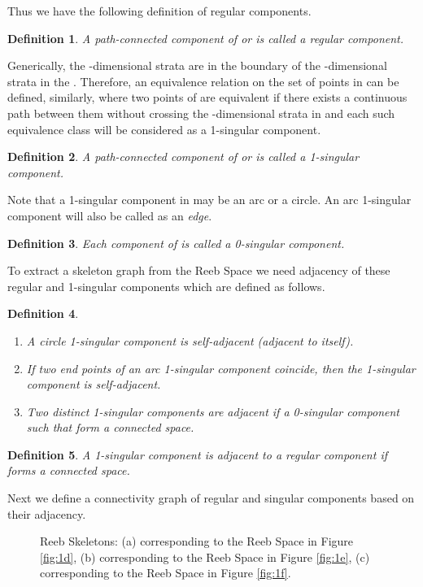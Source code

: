 \documentclass[twocolumn]{article}
\newcommand{\figref}[1]{Figure \ref{fig:#1}}
\newtheorem{dfn}{Definition}[section]
\begin{document}
\noindent
Thus we have the following definition of regular components.

\begin{dfn}
A path-connected component of  or  is called a regular component. 
\end{dfn}

\noindent
Generically, the -dimensional strata are in the boundary of
the -dimensional strata in the .
Therefore, an equivalence relation on the set of points in   can
be defined, similarly, where two points of  are equivalent if there exists a continuous path between
them without crossing the -dimensional strata in  and each such equivalence
class will be considered as a 1-singular component.

\begin{dfn}
A path-connected component of  or  is called a 1-singular component.
\end{dfn}

\noindent
Note that a 1-singular component in  may be an arc or a circle. An arc
1-singular component will also be called as an \emph{edge}.

\begin{dfn}
Each component of  is called a 0-singular component.
\end{dfn}

\noindent
To extract a skeleton graph from the Reeb Space we need adjacency of
these regular and 1-singular components which are defined as follows.

\begin{dfn}
\begin{enumerate}
\item A circle 1-singular component is self-adjacent (adjacent to itself).
\item If two end points of an arc 1-singular component coincide, then the
1-singular component is self-adjacent.
\item Two distinct 1-singular components  are
adjacent if  a 0-singular component 
such that  form a connected space.
\end{enumerate}
\end{dfn}

\begin{dfn}
A 1-singular component  is adjacent to a
regular component  if  forms a connected space.
\end{dfn}

Next we define a connectivity graph of regular and singular components
based on their adjacency.

\begin{figure}[t!]
\begin{center}
\end{center}
\vspace*{-2ex}
\caption{Reeb Skeletons: (a) corresponding to the Reeb Space in \figref{1d}, (b)
  corresponding to the Reeb Space in \figref{1e}, (c) corresponding to the
  Reeb Space in \figref{1f}.}
\label{fig:reeb-skeleton}
\end{figure}
\end{document}
